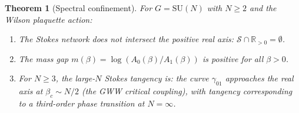 \documentclass[12pt]{article}
\newtheorem{theorem}{Theorem}[section]
\theoremstyle{definition}
\theoremstyle{remark}
\newcommand{\SU}{\mathrm{SU}}
\newcommand{\R}{\mathbb{R}}
\begin{document}
\begin{theorem}[Spectral confinement]
\label{thm:confinement}
For $G = \SU(N)$ with $N \ge 2$ and the Wilson plaquette action:
\begin{enumerate}[label=(\roman*)]
\item The Stokes network does not intersect the positive real axis:
  $\mathcal{S} \cap \R_{>0} = \emptyset$.
\item The mass gap $m(\beta) = \log(A_0(\beta)/A_1(\beta))$ is
  positive for all $\beta > 0$.
\item For $N \ge 3$, the large-$N$ Stokes tangency is:
  the curve $\gamma_{01}$ approaches the real axis at
  $\beta_c \sim N/2$ (the GWW critical coupling), with tangency
  corresponding to a third-order phase transition at $N = \infty$.
\end{enumerate}
\end{theorem}
\end{document}
